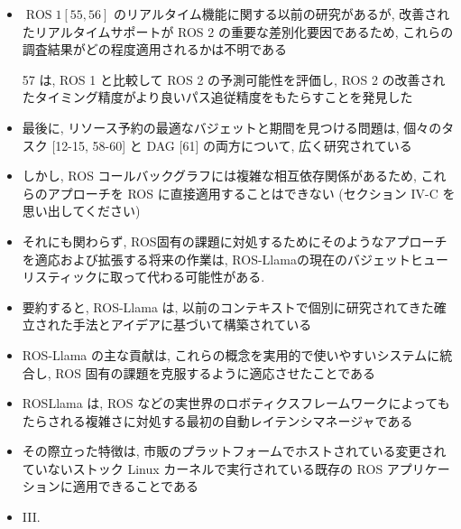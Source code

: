 {    \begin{frame}{}
        \begin{itemize}
            \item  $\operatorname{ROS} 1[55,56]$ のリアルタイム機能に関する以前の研究があるが, 改善されたリアルタイムサポートが ROS 2 の重要な差別化要因であるため, これらの調査結果がどの程度適用されるかは不明である
            \item [57] は, ROS 1 と比較して ROS 2 の予測可能性を評価し, ROS 2 の改善されたタイミング精度がより良いパス追従精度をもたらすことを発見した
        \end{itemize}
    \end{frame}

    \begin{frame}{}
        \begin{itemize}
            \item  最後に, リソース予約の最適なバジェットと期間を見つける問題は, 個々のタスク [12-15, 58-60] と DAG [61] の両方について, 広く研究されている
            \item しかし, ROS コールバックグラフには複雑な相互依存関係があるため, これらのアプローチを ROS に直接適用することはできない (セクション IV-C を思い出してください)
            \item それにも関わらず, ROS固有の課題に対処するためにそのようなアプローチを適応および拡張する将来の作業は, ROS-Llamaの現在のバジェットヒューリスティックに取って代わる可能性がある.
        \end{itemize}
    \end{frame}

    \begin{frame}{}
        \begin{itemize}
            \item 要約すると, ROS-Llama は, 以前のコンテキストで個別に研究されてきた確立された手法とアイデアに基づいて構築されている
            \item ROS-Llama の主な貢献は, これらの概念を実用的で使いやすいシステムに統合し, ROS 固有の課題を克服するように適応させたことである
            \item ROSLlama は, ROS などの実世界のロボティクスフレームワークによってもたらされる複雑さに対処する最初の自動レイテンシマネージャである
            \item その際立った特徴は, 市販のプラットフォームでホストされている変更されていないストック Linux カーネルで実行されている既存の ROS アプリケーションに適用できることである
            \item III.
        \end{itemize}
    \end{frame}
}
